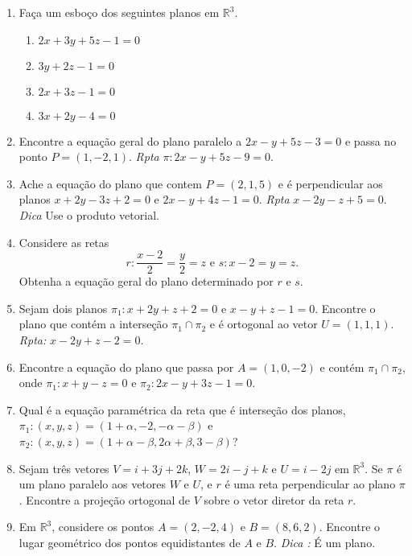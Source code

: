 \documentclass{article}
\theoremstyle{plain}
\theoremstyle{definition}
\theoremstyle{remark}
\begin{document}
 
\begin{enumerate}
  \item Faça um esboço dos seguintes planos em $\mathbb{R}^{3}$.
     \begin{enumerate}
     \item $2x+3y+5z-1=0$
     \item $3y+2z-1=0$
     \item $2x+3z-1=0$
     \item $3x+2y-4=0$
     \end{enumerate}  
   \item Encontre a equação geral do plano paralelo 
   a $2x-y+5z-3=0$ e passa no ponto $P=(1,-2,1)$.
   {\it Rpta} $\pi: 2x-y+5z-9=0$.
   \item Ache a equação do plano que contem 
   $P=(2,1,5)$ e é perpendicular aos planos 
    $x+2y-3z+2=0$ e $2x-y+4z-1=0$.
    {\it Rpta} $x-2y-z+5=0$. {\it Dica} Use o produto vetorial.
    \item Considere as retas 
    $$ r: \frac{x-2}{2}=\frac{y}{2}=z \text{ e }
       s:  x-2=y=z.$$
     Obtenha a equação geral do plano determinado por 
     $r$ e $s$.  
     \item Sejam dois planos 
      $\pi_1: x+2y+z+2=0$ e $x-y+z-1=0$.
      Encontre o plano que contém 
      a interseção $\pi_1 \cap \pi_2$ e 
      é ortogonal ao vetor $U=(1, 1, 1)$.
      {\it Rpta: } $x-2y+z-2=0$.
      \item Encontre a equação do plano 
      que passa por $A=(1,0,-2)$ e contém 
      $\pi_1 \cap \pi_2$, onde 
      $\pi_1: x+y-z=0$ e $\pi_2: 2x-y+3z-1=0$.
      \item Qual é a equação paramétrica da reta 
      que é interseção dos planos, 
      $\pi_1: (x,y,z)=(1+\alpha, -2, -\alpha-\beta)$ e 
      $\pi_2: (x,y,z)=(1+\alpha-\beta, 2\alpha+\beta, 3-\beta)$?
      \item Sejam três vetores 
      $V=i+3j+2k$, $W=2i-j+k$ e $U=i-2j$ em $\mathbb{R}^{3}$. 
      Se $\pi$ é um plano paralelo aos vetores 
      $W$ e $U$, e $r$ é uma reta perpendicular ao plano $\pi$.
      Encontre a projeção ortogonal de $V$ 
      sobre o vetor diretor da reta $r$.  
      \item Em $\mathbb{R}^{3}$, considere os pontos 
      $A=(2,-2,4)$ e $B=(8,6,2)$.
      Encontre o lugar geométrico dos pontos equidistantes de $A$ e $B$. {\it Dica :} É um plano.
      

\end{enumerate}
\end{document}
